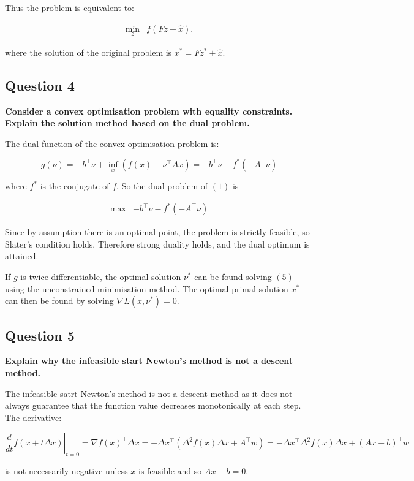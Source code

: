 Thus the problem is equivalent to: 

$$
\begin{array}{ll}
\displaystyle \min_z & f(Fz + \hat x).
\end{array}
$$

where the solution of the original problem is $x^* = Fz^* + \hat x$.

\subsection*{Question 4}
\textbf{Consider a convex optimisation problem with equality constraints. Explain the solution method based on the dual problem.}

The dual function of the convex optimisation problem is:

$$
g(\nu) = -b^\top \nu + \inf_x (f(x) + \nu^\top Ax) = -b^\top \nu - f^*(-A^\top \nu)
$$

where $f^*$ is the conjugate of $f$. So the dual problem of $(1)$ is

$$
\begin{array}{ll}
\max & -b^\top \nu - f^*(-A^\top \nu)
\end{array}
$$

Since by assumption there is an optimal point, the problem is strictly feasible, so Slater's condition holds. Therefore strong duality holds, and the dual optimum is attained. 

If $g$ is twice differentiable, the optimal solution $\nu^*$ can be found solving $(5)$ using the unconstrained minimisation method. The optimal primal solution $x^*$ can then be found by solving $\nabla L(x, \nu^*) = 0$. 


\subsection*{Question 5}
\textbf{Explain why the infeasible start Newton's method is not a descent method.}


The infeasible satrt Newton's method is not a descent method as it does not always guarantee that the function value decreases monotonically at each step. The derivative:

$$
\left.\frac{d}{dt} f(x+t\Delta x)\right|_{t=0} = \nabla f(x)^\top \Delta x = - \Delta x^\top (\Delta^2 f(x)\Delta x + A^\top w) = - \Delta x^\top \Delta^2 f(x)\Delta x + (Ax-b)^\top w
$$

is not necessarily negative unless $x$ is feasible and so $Ax-b=0$.

